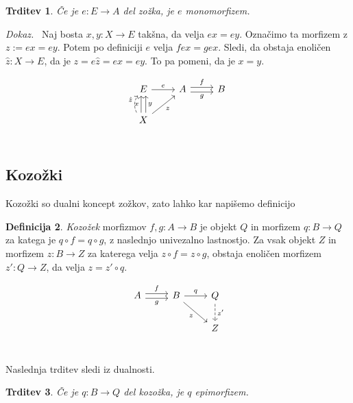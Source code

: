 \documentclass[12pt,a4paper]{book}
\theoremstyle{definition}
\newtheorem{definicija}{Definicija}[chapter]
\theoremstyle{plain}
\newtheorem{trditev}[definicija]{Trditev}
\newenvironment{dokaz}{\emph{Dokaz.}\ }{\hspace{\fill}{$\Box$}}
\theoremstyle{definition}
\theoremstyle{remark}
\begin{document}
\begin{trditev}
Če je $e : E \to A$ del zožka, je $e$ monomorfizem.
\end{trditev}
\begin{dokaz}
Naj bosta $x,y : X \to E$ takšna, da velja $ex = ey$. Označimo ta morfizem z $z := ex = ey$. Potem po definiciji $e$ velja $fex = gex$. Sledi, da obstaja enoličen $\hat{z} : X \to E$, da je $z = e\hat{z} = ex = ey$. To pa pomeni, da je $x = y$.

$$\begin{tikzcd}
E \ar[r, "e"] & A \ar[r, shift left, "f"] \ar[r, shift right, "g"'] & B \\
X \ar[u, bend left, shift left, dashed, "\hat{z}"] \ar[u, shift left, "x"] \ar[u, shift right, "y"'] \ar[ur, "z"'] \\
\end{tikzcd}$$

\end{dokaz}


\subsection{Kozožki}

Kozožki so dualni koncept zožkov, zato lahko kar napišemo definicijo

\begin{definicija}
\emph{Kozožek} morfizmov $f,g:A \to B$ je objekt $Q$ in morfizem $q: B \to Q$ za katega je $q \circ f = q \circ g$, z naslednjo univezalno lastnostjo. Za vsak objekt $Z$ in morfizem $z : B \to Z$ za katerega velja $z \circ f = z \circ g$, obstaja enoličen morfizem $z' : Q \to Z$, da velja $z = z' \circ q$.

$$\begin{tikzcd}
A \ar[r, shift left, "f"] \ar[r, shift right, "g"'] & B \ar[r, "q"] \ar[dr, "z"'] & Q \ar[d, dashed, "z'"] \\
& & Z \\
\end{tikzcd}$$

\end{definicija}

Naslednja trditev sledi iz dualnosti.

\begin{trditev}
Če je $q : B \to Q$ del kozožka, je $q$ epimorfizem.
\end{trditev}
\end{document}
